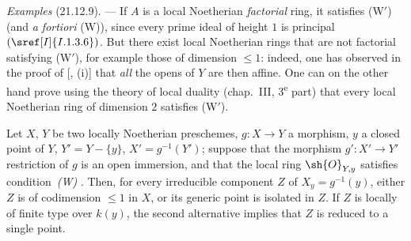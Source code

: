 \begin{env}[21.12.9]
\label{IV.21.12.9}
\emph{Examples} (21.12.9). ---
If $A$ is a local Noetherian \emph{factorial} ring, it satisfies (W$'$) (and \emph{a fortiori} (W)), since every prime ideal of height $1$ is principal $(\sref[I]{I.1.3.6})$.
But there exist local Noetherian rings that are not factorial satisfying (W$'$), for example those of dimension $\leq 1$:
indeed, one has observed in the proof of [, (i)] that \emph{all} the opens of $Y$ are then affine.
One can on the other hand prove using the theory of local duality (chap.~III, 3\textsuperscript{e} part) that every local Noetherian ring of dimension $2$ satisfies (W$'$).
\end{env}

\begin{proposition}[21.12.10]
\label{IV.21.12.10}
Let $X$, $Y$ be two locally Noetherian preschemes, $g:X\to Y$ a morphism, $y$ a closed point of $Y$, $Y'=Y-\{y\}$, $X'=g^{-1}(Y')$;
suppose that the morphism $g':X'\to Y'$ restriction of $g$ is an open immersion, and that the local ring $\sh{O}_{Y,y}$ satisfies condition~\emph{(W)} .
Then, for every irreducible component $Z$ of $X_y=g^{-1}(y)$, either $Z$ is of codimension $\leq 1$ in $X$, or its generic point is isolated in $Z$.
If $Z$ is locally of finite type over $k(y)$, the second alternative implies that $Z$ is reduced to a single point.
\end{proposition}

